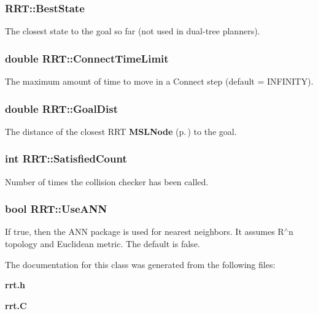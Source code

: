 \subsubsection{ RRT::Best\-State}\label{classRRT_m2}


The closest state to the goal so far (not used in dual-tree planners).

\subsubsection{\setlength{\rightskip}{0pt plus 5cm}double RRT::Connect\-Time\-Limit}\label{classRRT_m3}


The maximum amount of time to move in a Connect step (default = INFINITY).

\subsubsection{\setlength{\rightskip}{0pt plus 5cm}double RRT::Goal\-Dist}\label{classRRT_m1}


The distance of the closest RRT {\bf MSLNode} {\rm (p.\,\pageref{classMSLNode})} to the goal.

\subsubsection{\setlength{\rightskip}{0pt plus 5cm}int RRT::Satisfied\-Count}\label{classRRT_m4}


Number of times the collision checker has been called.

\subsubsection{\setlength{\rightskip}{0pt plus 5cm}bool RRT::Use\-ANN}\label{classRRT_m0}


If true, then the ANN package is used for nearest neighbors. It assumes R$^\wedge$n topology and Euclidean metric. The default is false.



The documentation for this class was generated from the following files:\begin{CompactItemize}
\item 
{\bf rrt.h}\item 
{\bf rrt.C}\end{CompactItemize}
